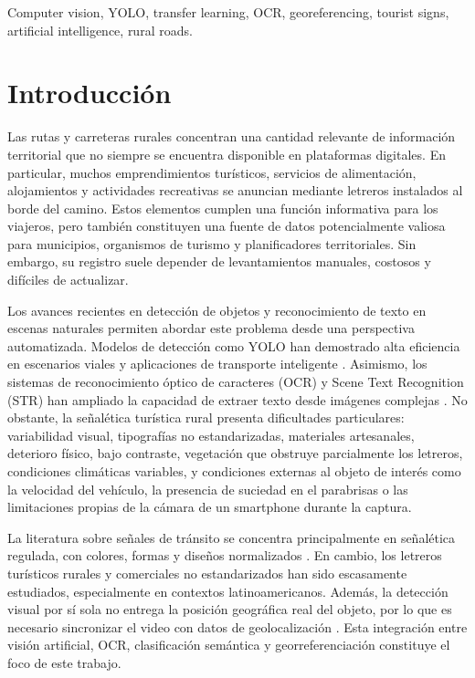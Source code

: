 \documentclass[conference]{IEEEtran}
\begin{document}
\begin{IEEEkeywords}
Computer vision, YOLO, transfer learning, OCR, georeferencing, tourist signs, artificial intelligence, rural roads.
\end{IEEEkeywords}

\section{Introducción}

Las rutas y carreteras rurales concentran una cantidad relevante de 
información territorial que no siempre se encuentra disponible en 
plataformas digitales. En particular, muchos emprendimientos turísticos,
servicios de alimentación, alojamientos y actividades recreativas se 
anuncian mediante letreros instalados al borde del camino. Estos elementos
cumplen una función informativa para los viajeros, pero también 
constituyen una fuente de datos potencialmente valiosa para municipios, 
organismos de turismo y planificadores territoriales. Sin embargo, su 
registro suele depender de levantamientos manuales, costosos y 
difíciles de actualizar.

Los avances recientes en detección de objetos y reconocimiento de texto 
en escenas naturales permiten abordar este problema desde una perspectiva 
automatizada. Modelos de detección como YOLO han demostrado alta 
eficiencia en escenarios viales y aplicaciones de transporte 
inteligente \cite{letreros-transito-pare-semaforo-1,yolo-vehiculos}. Asimismo, 
los sistemas de reconocimiento óptico de caracteres (OCR) y Scene Text 
Recognition (STR) han ampliado la capacidad de extraer texto desde 
imágenes complejas \cite{soni2025performance,ocr-curvo}. No obstante, 
la señalética turística rural presenta dificultades particulares: 
variabilidad visual, tipografías no estandarizadas, materiales 
artesanales, deterioro físico, bajo contraste, vegetación que obstruye 
parcialmente los letreros, condiciones climáticas variables, y 
condiciones externas al objeto de interés como la velocidad del 
vehículo, la presencia de suciedad en el parabrisas o las limitaciones 
propias de la cámara de un smartphone durante la captura.

La literatura sobre señales de tránsito se concentra principalmente 
en señalética regulada, con colores, formas y diseños normalizados
\cite{TT100K-Dataset,gtsdb-dataset}. En cambio, los letreros turísticos 
rurales y comerciales no estandarizados han sido escasamente estudiados, 
especialmente en contextos latinoamericanos. Además, la detección 
visual por sí sola no entrega la posición geográfica real del objeto,
por lo que es necesario sincronizar el video con datos de geolocalización
 \cite{roboflow-georeferencing}. Esta integración entre visión 
artificial, OCR, clasificación semántica y georreferenciación 
constituye el foco de este trabajo.
\end{document}
